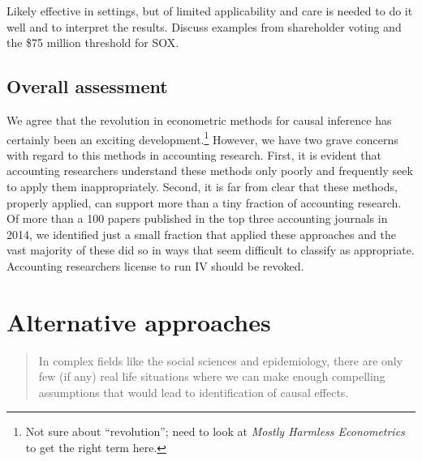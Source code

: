 \documentclass[11pt]{amsart}
\begin{document}



Likely effective in settings, but of limited applicability and care is needed to do it well and to interpret the results. Discuss examples from shareholder voting and the \$75 million threshold for SOX.

\subsection{Overall assessment}

We agree that the revolution in econometric methods for causal inference has certainly been an exciting development.\footnote{Not sure about ``revolution''; need to look at \emph{Mostly Harmless Econometrics} to get the right term here.} However, we have two grave concerns with regard to this methods in accounting research. First, it is evident that accounting researchers understand these methods only poorly and frequently seek to apply them inappropriately. Second,  it is far from clear that these methods, properly applied, can support more than a tiny fraction of accounting research. Of more than a 100 papers published in the top three accounting journals in 2014, we identified just a small fraction that applied these approaches and the vast majority of these did so in ways that seem difficult to classify as appropriate. Accounting researchers license to run IV should be revoked.

\section{Alternative approaches}

\begin{quotation}
In complex fields like the social sciences and epidemiology, there are only few (if any) real life situations where we can make enough compelling assumptions that would lead to identification of causal effects.
\end{quotation}
\end{document}
